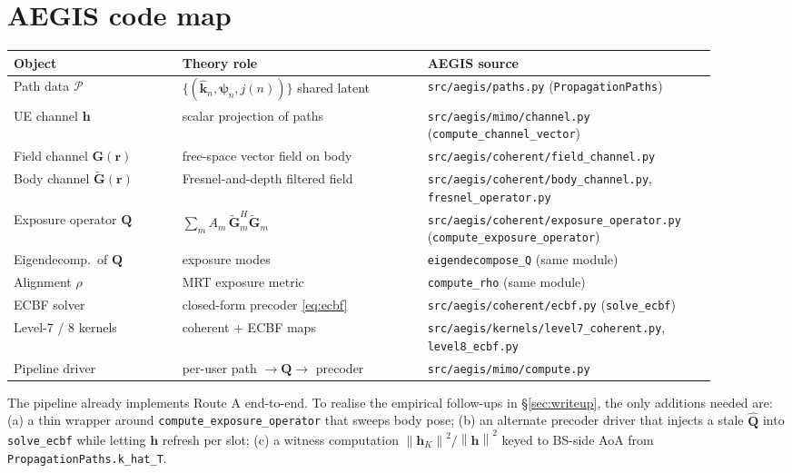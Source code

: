 \documentclass[11pt,a4paper]{article}
\theoremstyle{definition}
\newcommand{\rr}{\mathbf{r}}
\newcommand{\hh}{\mathbf{h}}
\newcommand{\kh}{\hat{\mathbf{k}}}
\newcommand{\Q}{\mathbf{Q}}
\newcommand{\Qhat}{\widehat{\mathbf{Q}}}
\newcommand{\G}{\mathbf{G}}
\newcommand{\Gt}{\widetilde{\mathbf{G}}}
\newcommand{\psib}{\boldsymbol{\psi}}
\newcommand{\norm}[1]{\left\lVert #1 \right\rVert}
\begin{document}
\appendix

\section{AEGIS code map}
\label{app:aegis-map}

\begin{center}
\small
\begin{tabular}{p{0.22\linewidth} p{0.32\linewidth} p{0.36\linewidth}}
\toprule
Object & Theory role & AEGIS source \\
\midrule
Path data $\mathcal{P}$
  & $\{(\kh_n,\psib_n,j(n))\}$ shared latent
  & \texttt{src/aegis/paths.py} (\texttt{PropagationPaths}) \\
UE channel $\hh$
  & scalar projection of paths
  & \texttt{src/aegis/mimo/channel.py}
    (\texttt{compute\_channel\_vector}) \\
Field channel $\G(\rr)$
  & free-space vector field on body
  & \texttt{src/aegis/coherent/field\_channel.py} \\
Body channel $\Gt(\rr)$
  & Fresnel-and-depth filtered field
  & \texttt{src/aegis/coherent/body\_channel.py},
    \texttt{fresnel\_operator.py} \\
Exposure operator $\Q$
  & $\sum_m A_m\,\Gt_m^H\Gt_m$
  & \texttt{src/aegis/coherent/exposure\_operator.py}
    (\texttt{compute\_exposure\_operator}) \\
Eigendecomp.\ of $\Q$
  & exposure modes
  & \texttt{eigendecompose\_Q} (same module) \\
Alignment $\rho$
  & MRT exposure metric
  & \texttt{compute\_rho} (same module) \\
ECBF solver
  & closed-form precoder \eqref{eq:ecbf}
  & \texttt{src/aegis/coherent/ecbf.py} (\texttt{solve\_ecbf}) \\
Level-7 / 8 kernels
  & coherent + ECBF maps
  & \texttt{src/aegis/kernels/level7\_coherent.py},
    \texttt{level8\_ecbf.py} \\
Pipeline driver
  & per-user path $\to\Q\to$ precoder
  & \texttt{src/aegis/mimo/compute.py} \\
\bottomrule
\end{tabular}
\end{center}

The pipeline already implements Route A end-to-end. To realise the
empirical follow-ups in \S\ref{sec:writeup}, the only additions needed
are: (a) a thin wrapper around \texttt{compute\_exposure\_operator} that
sweeps body pose; (b) an alternate precoder driver that injects a
stale $\Qhat$ into \texttt{solve\_ecbf} while letting $\hh$ refresh per
slot; (c) a witness computation
$\norm{\hh_K}^2/\norm{\hh}^2$ keyed to BS-side AoA from
\texttt{PropagationPaths.k\_hat\_T}.
\end{document}
